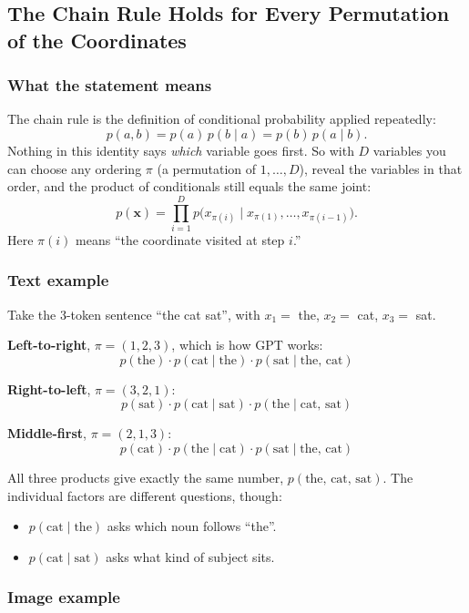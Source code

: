 \subsection*{The Chain Rule Holds for Every Permutation of the Coordinates}

\subsubsection*{What the statement means}

The chain rule is the definition of conditional probability applied repeatedly:
\[
p(a, b) = p(a)\,p(b \mid a) = p(b)\,p(a \mid b).
\]
Nothing in this identity says \emph{which} variable goes first. So with $D$ variables you can choose any ordering $\pi$ (a permutation of $1,\dots,D$), reveal the variables in that order, and the product of conditionals still equals the same joint:
\[
p(\mathbf{x}) = \prod_{i=1}^{D} p\big(x_{\pi(i)} \mid x_{\pi(1)}, \dots, x_{\pi(i-1)}\big).
\]
Here $\pi(i)$ means ``the coordinate visited at step $i$.''

\subsubsection*{Text example}

Take the 3-token sentence ``the cat sat'', with $x_1=$ the, $x_2=$ cat, $x_3=$ sat.

\textbf{Left-to-right}, $\pi = (1,2,3)$, which is how GPT works:
\[
p(\text{the})\cdot p(\text{cat}\mid\text{the})\cdot p(\text{sat}\mid\text{the, cat})
\]

\textbf{Right-to-left}, $\pi = (3,2,1)$:
\[
p(\text{sat})\cdot p(\text{cat}\mid\text{sat})\cdot p(\text{the}\mid\text{cat, sat})
\]

\textbf{Middle-first}, $\pi = (2,1,3)$:
\[
p(\text{cat})\cdot p(\text{the}\mid\text{cat})\cdot p(\text{sat}\mid\text{the, cat})
\]

All three products give exactly the same number, $p(\text{the, cat, sat})$. The individual factors are different questions, though:
\begin{itemize}
  \item $p(\text{cat} \mid \text{the})$ asks which noun follows ``the''.
  \item $p(\text{cat} \mid \text{sat})$ asks what kind of subject sits.
\end{itemize}

\subsubsection*{Image example}

